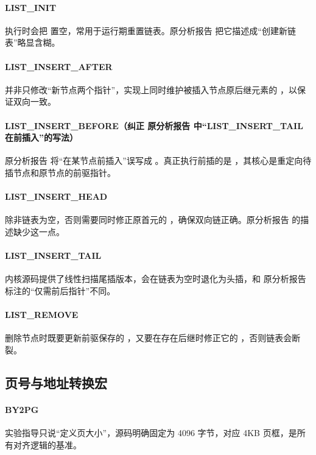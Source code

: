 \documentclass[12pt,oneside]{ctexbook}
\begin{document}
\paragraph{LIST\_INIT}
执行时会把  置空，常用于运行期重置链表。原分析报告 把它描述成“创建新链表”略显含糊。

\paragraph{LIST\_INSERT\_AFTER}
并非只修改“新节点两个指针”，实现上同时维护被插入节点原后继元素的 ，以保证双向一致。

\paragraph{LIST\_INSERT\_BEFORE（纠正 原分析报告 中“LIST\_INSERT\_TAIL 在前插入”的写法）}
原分析报告 将“在某节点前插入”误写成 。真正执行前插的是 ，其核心是重定向待插节点和原节点的前驱指针。

\paragraph{LIST\_INSERT\_HEAD}
除非链表为空，否则需要同时修正原首元的 ，确保双向链正确。原分析报告 的描述缺少这一点。

\paragraph{LIST\_INSERT\_TAIL}
内核源码提供了线性扫描尾插版本，会在链表为空时退化为头插，和 原分析报告 标注的“仅需前后指针”不同。

\paragraph{LIST\_REMOVE}
删除节点时既要更新前驱保存的 ，又要在存在后继时修正它的 ，否则链表会断裂。
\subsection*{页号与地址转换宏}
\paragraph{BY2PG}
实验指导只说“定义页大小”，源码明确固定为 4096 字节，对应 4KB 页框，是所有对齐逻辑的基准。
\end{document}
